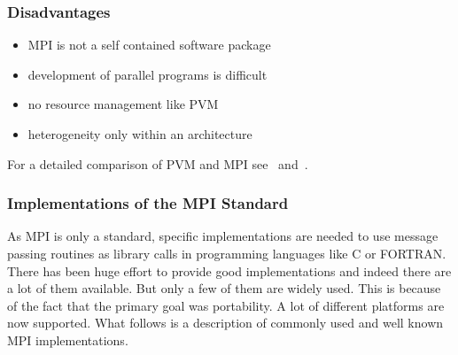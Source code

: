 \subsubsection{Disadvantages}
\begin{itemize}
\item MPI is not a self contained software package
\item development of parallel programs is difficult
\item no resource management like PVM 
\item heterogeneity only within an architecture
\end{itemize}


For a detailed comparison of PVM and MPI see~\cite{geist96pam}
and~\cite{gropp02ggd}.

\subsubsection{Implementations of the MPI Standard}
\label{sec:mpi-implementations}

As MPI is only a standard, specific implementations are needed to use
message passing routines as library calls in programming languages
like C or FORTRAN. There has been huge effort to provide good
implementations and indeed there are a lot of them available. But
only a few of them are widely used. This is because of the fact that
the primary goal was portability. A lot of different platforms are now
supported. What follows is a description of commonly used and well
known MPI implementations.

